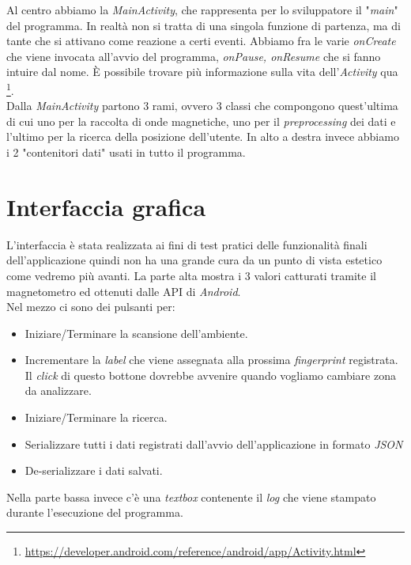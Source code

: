 Al centro abbiamo la \textit{MainActivity}, che rappresenta per lo sviluppatore il "\textit{main}" del programma. In realt\`a non si tratta di una singola funzione di partenza, ma di tante che si attivano come reazione a certi eventi. Abbiamo fra le varie \textit{onCreate} che viene invocata all'avvio del programma, \textit{onPause, onResume} che si fanno intuire dal nome. \`E possibile trovare pi\`u informazione sulla vita dell'\textit{Activity} qua \footnote{\url{https://developer.android.com/reference/android/app/Activity.html}}.\\
Dalla \textit{MainActivity} partono 3 rami, ovvero 3 classi che compongono quest'ultima di cui uno per la raccolta di onde magnetiche, uno per il \textit{preprocessing} dei dati e l'ultimo per la ricerca della posizione dell'utente. In alto a destra invece abbiamo i 2 "contenitori dati" usati in tutto il programma.

\section{Interfaccia grafica}
L'interfaccia \`e stata realizzata ai fini di test pratici delle funzionalit\`a finali dell'applicazione quindi non ha una grande cura da un punto di vista estetico come vedremo pi\`u  avanti.
La parte alta mostra i 3 valori catturati tramite il magnetometro ed ottenuti dalle API di \textit{Android}. \\
Nel mezzo ci sono dei pulsanti per:
\begin{itemize}
	\item Iniziare/Terminare la scansione dell'ambiente.
	\item Incrementare la \textit{label} che viene assegnata alla prossima \textit{fingerprint} registrata. Il \textit{click} di questo bottone dovrebbe avvenire quando vogliamo cambiare zona da analizzare.
	\item Iniziare/Terminare la ricerca.
	\item Serializzare tutti i dati registrati dall'avvio dell'applicazione in formato \textit{JSON}
	\item De-serializzare i dati salvati.
\end{itemize}
Nella parte bassa invece c'\`e una \textit{textbox} contenente il \textit{log} che viene stampato durante l'esecuzione del programma.

